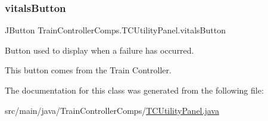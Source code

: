\mbox{\label{classTrainControllerComps_1_1TCUtilityPanel_a8d0c793041cf07bd154325e0288bf7c6}} 
\subsubsection{\texorpdfstring{vitals\+Button}{vitalsButton}}
{\footnotesize\ttfamily J\+Button Train\+Controller\+Comps.\+T\+C\+Utility\+Panel.\+vitals\+Button\hspace{0.3cm}{\ttfamily [private]}}



Button used to display when a failure has occurred. 

This button comes from the Train Controller. 

The documentation for this class was generated from the following file\+:\begin{DoxyCompactItemize}
\item 
src/main/java/\+Train\+Controller\+Comps/\hyperlink{TCUtilityPanel_8java}{T\+C\+Utility\+Panel.\+java}\end{DoxyCompactItemize}
